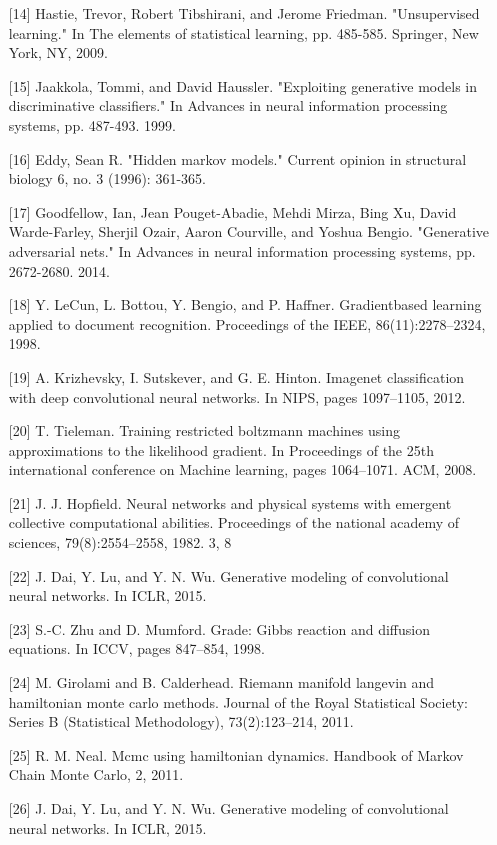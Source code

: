 \begin{itemize}
	\item [{[}14{]}] Hastie, Trevor, Robert Tibshirani, and Jerome Friedman. "Unsupervised learning." In The elements of statistical learning, pp. 485-585. Springer, New York, NY, 2009.
	\item [{[}15{]}] Jaakkola, Tommi, and David Haussler. "Exploiting generative models in discriminative classifiers." In Advances in neural information processing systems, pp. 487-493. 1999.
	\item [{[}16{]}] Eddy, Sean R. "Hidden markov models." Current opinion in structural biology 6, no. 3 (1996): 361-365.
	\item [{[}17{]}] Goodfellow, Ian, Jean Pouget-Abadie, Mehdi Mirza, Bing Xu, David Warde-Farley, Sherjil Ozair, Aaron Courville, and Yoshua Bengio. "Generative adversarial nets." In Advances in neural information processing systems, pp. 2672-2680. 2014.
	\item [{[}18{]}] Y. LeCun, L. Bottou, Y. Bengio, and P. Haffner. Gradientbased learning applied to document recognition. Proceedings of the IEEE, 86(11):2278–2324, 1998.
	\item [{[}19{]}] A. Krizhevsky, I. Sutskever, and G. E. Hinton. Imagenet classification with deep convolutional neural networks. In NIPS, pages 1097–1105, 2012.
	\item [{[}20{]}] T. Tieleman. Training restricted boltzmann machines using approximations to the likelihood gradient. In Proceedings of the 25th international conference on Machine learning, pages 1064–1071. ACM, 2008.
	\item [{[}21{]}] J. J. Hopfield. Neural networks and physical systems with emergent collective computational abilities. Proceedings of the national academy of sciences, 79(8):2554–2558, 1982. 3, 8
	\item [{[}22{]}] J. Dai, Y. Lu, and Y. N. Wu. Generative modeling of convolutional neural networks. In ICLR, 2015.
	\item [{[}23{]}] S.-C. Zhu and D. Mumford. Grade: Gibbs reaction and diffusion equations. In ICCV, pages 847–854, 1998.
	\item [{[}24{]}] M. Girolami and B. Calderhead. Riemann manifold langevin and hamiltonian monte carlo methods. Journal of the Royal Statistical Society: Series B (Statistical Methodology), 73(2):123–214, 2011.
	\item [{[}25{]}] R. M. Neal. Mcmc using hamiltonian dynamics. Handbook of Markov Chain Monte Carlo, 2, 2011.
	\item [{[}26{]}] J. Dai, Y. Lu, and Y. N. Wu. Generative modeling of convolutional neural networks. In ICLR, 2015.

\end{itemize}
